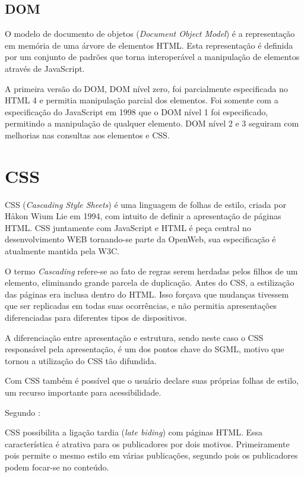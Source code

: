 \documentclass[
12pt,
a4paper,
portuges,
draft
]{report}
\renewenvironment{quote}
               {\list{}{\rightmargin\leftmargin}%
                \item\relax\fontsize{10}{12}}
               {\endlist}
\begin{document}
\subsection{DOM}

O modelo de documento de objetos (\textit{Document Object Model}) é a representação
em memória de uma árvore de elementos HTML. Esta representação é definida por
um conjunto de padrões que torna interoperável a manipulação de elementos através de
JavaScript.

A primeira versão do DOM, DOM nível zero, foi parcialmente
especificada no HTML 4 e permitia manipulação parcial dos elementos.
Foi somente com a especificação do JavaScript em 1998 que o DOM nível 1 foi especificado,
permitindo a manipulação de qualquer elemento. DOM nível 2 e 3 seguiram com melhorias nas
consultas aos elementos e CSS.

\section{CSS}

CSS (\textit{Cascading Style Sheets}) é uma linguagem de folhas de
estilo, criada por Håkon Wium Lie em 1994, com intuito de definir a
apresentação de páginas HTML. CSS juntamente com JavaScript e HTML
é peça central no desenvolvimento WEB tornando-se parte da OpenWeb,
sua especificação é atualmente mantida pela W3C.

O termo \textit{Cascading} refere-se ao fato de regras serem herdadas
pelos filhos de um elemento, eliminando grande parcela de duplicação.
Antes do CSS, a estilização das páginas era inclusa dentro do HTML.
Isso forçava que mudanças tivessem que ser replicadas em todas suas
ocorrências, e não permitia apresentações diferenciadas para
diferentes tipos de dispositivos.

A diferenciação entre apresentação e estrutura, sendo neste caso o
CSS responsável pela apresentação, é um dos pontos chave do SGML,
motivo que tornou a utilização do CSS tão difundida.

Com CSS também é possível que o usuário declare suas próprias
folhas de estilo, um recurso importante para acessibilidade.

Segundo \cite[pp. 23--24]{CascadingStyleSheets}:

\begin{quote}
CSS possibilita a ligação tardia (\textit{late biding}) com
páginas HTML. Essa característica é atrativa para os publicadores
por dois motivos. Primeiramente pois permite o mesmo estilo em várias
publicações, segundo pois os publicadores podem focar-se no conteúdo.
\end{quote}
\end{document}
